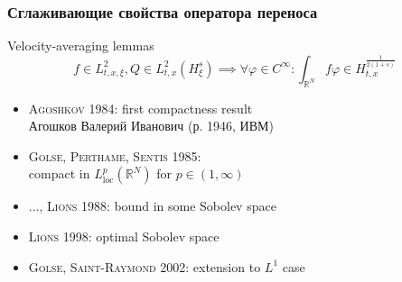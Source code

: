 \documentclass[mathserif]{beamer} %
\newcommand{\Cite}[2][]{\alert{\textsc{#2 #1}}}
\renewcommand{\phi}{\varphi}
\begin{document}
\begin{frame}
    \frametitle{Сглаживающие свойства оператора переноса}
    {\centering Velocity-averaging lemmas}
    \begin{equation*}
        f\in L^2_{t,x,\xi}, Q\in L^2_{t,x}(H_\xi^s) \implies
            \forall\phi\in C^\infty: \int_{\mathbb{R}^N} f\phi\in H_{t,x}^{\frac1{2(1+s)}}
    \end{equation*}
    \begin{itemize}
        \item \Cite[1984]{Agoshkov}: first compactness result \\
            {\footnotesize Агошков Валерий Иванович (р. 1946, ИВМ)}
        \item \Cite[1985]{Golse, Perthame, Sentis}:\\compact in \(L_\mathrm{loc}^p(\mathbb{R}^N)\) for \(p\in(1,\infty)\)
        \item \Cite[1988]{..., Lions}: bound in some Sobolev space
        \item \Cite[1998]{Lions}: optimal Sobolev space
        \item \Cite[2002]{Golse, Saint-Raymond}: extension to \(L^1\) case
    \end{itemize}
\end{frame}
\end{document}
